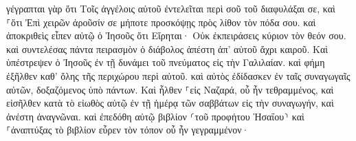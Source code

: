 \documentclass{openreader}
\begin{document}
γέγραπται γὰρ ὅτι Τοῖς ἀγγέλοις αὐτοῦ ἐντελεῖται περὶ σοῦ τοῦ διαφυλάξαι σε, 
καὶ ⸀ὅτι Ἐπὶ χειρῶν ἀροῦσίν σε μήποτε προσκόψῃς πρὸς λίθον τὸν πόδα σου. 
καὶ ἀποκριθεὶς εἶπεν αὐτῷ ὁ Ἰησοῦς ὅτι Εἴρηται· Οὐκ ἐκπειράσεις κύριον τὸν θεόν σου. 
καὶ συντελέσας πάντα πειρασμὸν ὁ διάβολος ἀπέστη ἀπ’ αὐτοῦ ἄχρι καιροῦ. 
Καὶ ὑπέστρεψεν ὁ Ἰησοῦς ἐν τῇ δυνάμει τοῦ πνεύματος εἰς τὴν Γαλιλαίαν. καὶ φήμη ἐξῆλθεν καθ’ ὅλης τῆς περιχώρου περὶ αὐτοῦ. 
καὶ αὐτὸς ἐδίδασκεν ἐν ταῖς συναγωγαῖς αὐτῶν, δοξαζόμενος ὑπὸ πάντων. 
Καὶ ἦλθεν ⸀εἰς Ναζαρά, οὗ ἦν τεθραμμένος, καὶ εἰσῆλθεν κατὰ τὸ εἰωθὸς αὐτῷ ἐν τῇ ἡμέρᾳ τῶν σαββάτων εἰς τὴν συναγωγήν, καὶ ἀνέστη ἀναγνῶναι. 
καὶ ἐπεδόθη αὐτῷ βιβλίον ⸂τοῦ προφήτου Ἠσαΐου⸃ καὶ ⸀ἀναπτύξας τὸ βιβλίον εὗρεν τὸν τόπον οὗ ἦν γεγραμμένον· 
\end{document}
